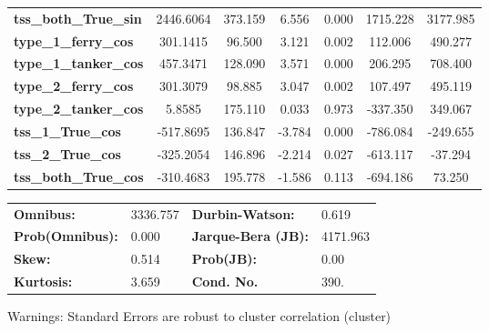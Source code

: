 \documentclass[twoside,symmetric,notoc]{tufte-book}
\begin{document}
{\begin{fullwidth}
\begin{center}
\begin{tabular}{lcccccc}
\textbf{tss\_both\_True\_sin} &    2446.6064  &      373.159     &     6.556  &         0.000        &     1715.228    &     3177.985     \\
\textbf{type\_1\_ferry\_cos}  &     301.1415  &       96.500     &     3.121  &         0.002        &      112.006    &      490.277     \\
\textbf{type\_1\_tanker\_cos} &     457.3471  &      128.090     &     3.571  &         0.000        &      206.295    &      708.400     \\
\textbf{type\_2\_ferry\_cos}  &     301.3079  &       98.885     &     3.047  &         0.002        &      107.497    &      495.119     \\
\textbf{type\_2\_tanker\_cos} &       5.8585  &      175.110     &     0.033  &         0.973        &     -337.350    &      349.067     \\
\textbf{tss\_1\_True\_cos}    &    -517.8695  &      136.847     &    -3.784  &         0.000        &     -786.084    &     -249.655     \\
\textbf{tss\_2\_True\_cos}    &    -325.2054  &      146.896     &    -2.214  &         0.027        &     -613.117    &      -37.294     \\
\textbf{tss\_both\_True\_cos} &    -310.4683  &      195.778     &    -1.586  &         0.113        &     -694.186    &       73.250     \\
\bottomrule
\end{tabular}
\begin{tabular}{llll}
\textbf{Omnibus:}       & 3336.757 & \textbf{  Durbin-Watson:     } &    0.619  \\
\textbf{Prob(Omnibus):} &   0.000  & \textbf{  Jarque-Bera (JB):  } & 4171.963  \\
\textbf{Skew:}          &   0.514  & \textbf{  Prob(JB):          } &     0.00  \\
\textbf{Kurtosis:}      &   3.659  & \textbf{  Cond. No.          } &     390.  \\
\bottomrule
\end{tabular}
\end{center}

Warnings: \newline
 [1] Standard Errors are robust to cluster correlation (cluster)
\end{fullwidth}
}
\newpage
\end{document}
